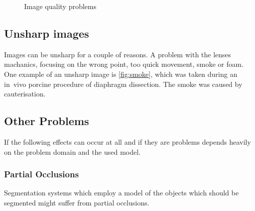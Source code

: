 \begin{figure}
{}
%
\caption{Image quality problems}
\label{fig:test}
\end{figure}


\subsection{Unsharp images}
Images can be unsharp for a couple of reasons. A problem with the lenses
machanics, focusing on the wrong point, too quick movement, smoke or foam.
One example of an unsharp image is \cref{fig:smoke}, which was taken during an
in~vivo porcine procedure of diaphragm dissection. The smoke was caused by
cauterisation.


\subsection{Other Problems}
If the following effects can occur at all and if they are problems depends
heavily on the problem domain and the used model.

\subsubsection{Partial Occlusions}
Segmentation systems which employ a model of the objects which should be
segmented might suffer from partial occlusions.

